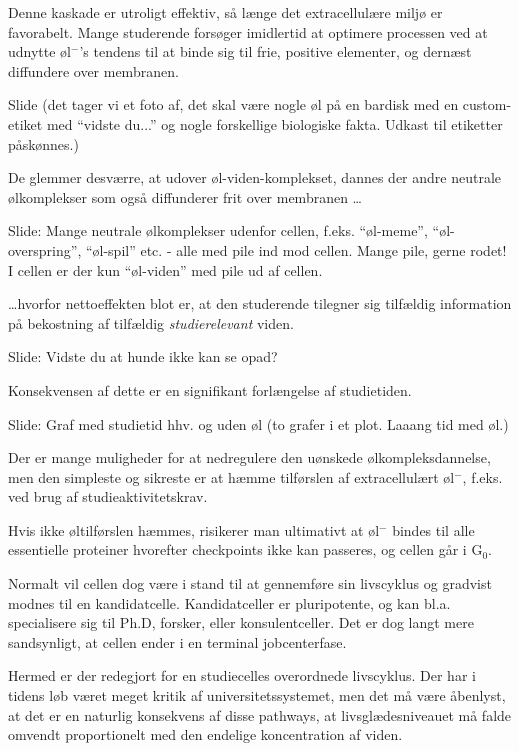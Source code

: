\documentclass[a4paper,12pt]{article}
\begin{document}
\begin{sketch}
 Denne kaskade er utroligt effektiv, så længe det extracellulære miljø er favorabelt. Mange studerende forsøger imidlertid at optimere processen ved at udnytte øl$^-$'s tendens til at binde sig til frie, positive elementer, og dernæst diffundere over membranen.

 Slide (det tager vi et foto af, det skal være nogle øl på en bardisk med en custom-etiket med ``vidste du...'' og nogle forskellige biologiske fakta. Udkast til etiketter påskønnes.)

 De glemmer desværre, at udover øl-viden-komplekset, dannes der andre neutrale ølkomplekser som også diffunderer frit over membranen \ldots

 Slide: Mange neutrale ølkomplekser udenfor cellen, f.eks. "`øl-meme"', "`øl-overspring"', "`øl-spil"' etc. - alle med pile ind mod cellen. Mange pile, gerne rodet! I cellen er der kun "`øl-viden"' med pile ud af cellen. 

 \ldots hvorfor nettoeffekten blot er, at den studerende tilegner sig tilfældig information på bekostning af tilfældig \emph{studierelevant} viden.

 Slide: Vidste du at hunde ikke kan se opad?

 Konsekvensen af dette er en signifikant forlængelse af studietiden.

 Slide: Graf med studietid hhv. og uden øl (to grafer i et plot. Laaang tid med øl.)

 Der er mange muligheder for at nedregulere den uønskede ølkompleksdannelse, men den simpleste og sikreste er at hæmme tilførslen af extracellulært øl$^-$, f.eks. ved brug af studieaktivitetskrav.

 Hvis ikke øltilførslen hæmmes, risikerer man ultimativt at øl$^-$ bindes til alle essentielle proteiner hvorefter checkpoints ikke kan passeres, og cellen går i G$_0$.

 Normalt vil cellen dog være i stand til at gennemføre sin livscyklus og gradvist modnes til en kandidatcelle. Kandidatceller er pluripotente, og kan bl.a. specialisere sig til Ph.D, forsker, eller konsulentceller. Det er dog langt mere sandsynligt, at cellen ender i en terminal jobcenterfase.

 Hermed er der redegjort for en studiecelles overordnede livscyklus. Der har i tidens løb været meget kritik af universitetssystemet, men det må være åbenlyst, at det er en naturlig konsekvens af disse pathways, at livsglædesniveauet må falde omvendt proportionelt med den endelige koncentration af viden.

\end{sketch}
\end{document}
